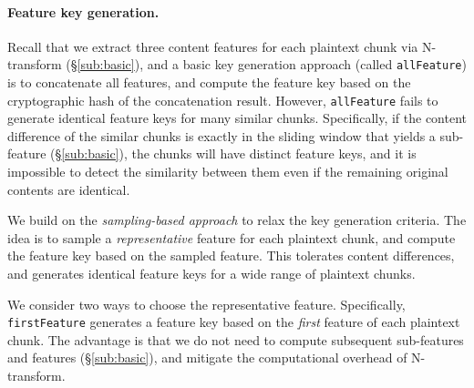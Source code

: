 


\paragraph{Feature key generation.}
Recall that we extract three content features for each plaintext chunk via N-transform (\S\ref{sub:basic}), and a basic key generation approach (called {\tt allFeature}) is to concatenate all features, and compute the feature key based on the cryptographic hash of the concatenation result. However, {\tt allFeature} fails to generate identical feature keys for many similar chunks. Specifically, if the content difference of the similar chunks is exactly in the sliding window that yields a sub-feature (\S\ref{sub:basic}), the chunks will have distinct feature keys, and it is impossible to detect the similarity between them even if the remaining original contents are identical.

We build on the {\em sampling-based approach} \cite{bhagwat09, dong11, qin17} to relax the key generation criteria. The idea is to sample a {\em representative} feature for each plaintext chunk, and compute the feature key based on the sampled feature. This tolerates content differences, and generates identical feature keys for a wide range of plaintext chunks.

We consider two ways to choose the representative feature. Specifically, {\tt firstFeature} generates a feature key based on the {\em first} feature of each plaintext chunk. The advantage is that we do not need to compute subsequent sub-features and features (\S\ref{sub:basic}), and mitigate the computational overhead \cite{zhang19} of N-transform.

